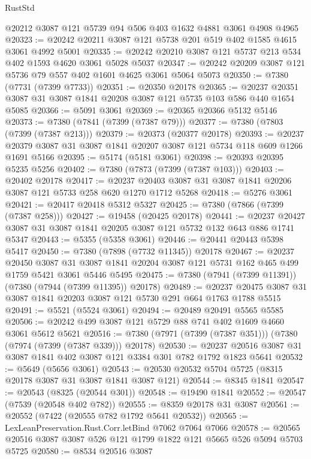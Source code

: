 \begin{lexlean}{RustStd}
\begin{coremodule}
    @20212
    @3087
    @121
    @5739
    @94
    @506
    @403
    @1632
    @4881
    @3061
    @4908
    @4965
@20323 := @20242 @20211 @3087 @121 @5738 @201 @519 @402 @1585 @4615 @3061 @4992 @5001
@20335 := @20242 @20210 @3087 @121 @5737 @213 @534 @402 @1593 @4620 @3061 @5028 @5037
@20347 := @20242 @20209 @3087 @121 @5736 @79 @557 @402 @1601 @4625 @3061 @5064 @5073
@20350 := @7380 (@7731 (@7399 @7733))
@20351 := @20350 @20178
@20365 := @20237 @20351 @3087 @31 @3087 @1841 @20208 @3087 @121 @5735 @103 @586 @440 @1654 @5085
@20366 := @5091 @3061
@20369 := @20365 @20366 @5132 @5146
@20373 := @7380 (@7841 (@7399 (@7387 @79)))
@20377 := @7380 (@7803 (@7399 (@7387 @213)))
@20379 := @20373 (@20377 @20178)
@20393 := @20237 @20379 @3087 @31 @3087 @1841 @20207 @3087 @121 @5734 @118 @609 @1266 @1691 @5166
@20395 := @5174 (@5181 @3061)
@20398 := @20393 @20395 @5235 @5256
@20402 := @7380 (@7873 (@7399 (@7387 @103)))
@20403 := @20402 @20178
@20417 := @20237 @20403 @3087 @31 @3087 @1841 @20206 @3087 @121 @5733 @258 @620 @1270 @1712 @5268
@20418 := @5276 @3061
@20421 := @20417 @20418 @5312 @5327
@20425 := @7380 (@7866 (@7399 (@7387 @258)))
@20427 := @19458 (@20425 @20178)
@20441 := @20237 @20427 @3087 @31 @3087 @1841 @20205 @3087 @121 @5732 @132 @643 @886 @1741 @5347
@20443 := @5355 (@5358 @3061)
@20446 := @20441 @20443 @5398 @5417
@20450 := @7380 (@7898 (@7732 @11345)) @20178
@20467 := @20237
    @20450
    @3087
    @31
    @3087
    @1841
    @20204
    @3087
    @121
    @5731
    @162
    @465
    @499
    @1759
    @5421
    @3061
    @5446
    @5495
@20475 := @7380 (@7941 (@7399 @11391)) (@7380 (@7944 (@7399 @11395)) @20178)
@20489 := @20237 @20475 @3087 @31 @3087 @1841 @20203 @3087 @121 @5730 @291 @664 @1763 @1788 @5515
@20491 := @5521 (@5524 @3061)
@20494 := @20489 @20491 @5565 @5585
@20506 := @20242 @499 @3087 @121 @5729 @88 @741 @402 @1609 @4660 @3061 @5612 @5621
@20516 := @7380 (@7971 (@7399 (@7387 @351))) (@7380 (@7974 (@7399 (@7387 @339))) @20178)
@20530 := @20237 @20516 @3087 @31 @3087 @1841 @402 @3087 @121 @3384 @301 @782 @1792 @1823 @5641
@20532 := @5649 (@5656 @3061)
@20543 := @20530 @20532 @5704 @5725 (@8315 @20178 @3087 @31 @3087 @1841 @3087 @121)
@20544 := @8345 @1841
@20547 := @20543 (@8325 (@20544 @301))
@20548 := @19490 @1841
@20552 := @20547 (@7539 (@20548 @402 @782))
@20555 := @8359 @20178 @31 @3087
@20561 := @20552 (@7422 (@20555 @782 @1792 @5641 @20532))
@20565 := LexLeanPreservation.Rust.Corr.letBind @7062 @7064 @7066
@20578 := @20565 @20516 @3087 @3087 @526 @121 @1799 @1822 @121 @5665 @526 @5094 @5703 @5725
@20580 := @8534 @20516 @3087

\end{coremodule}
\end{lexlean}
